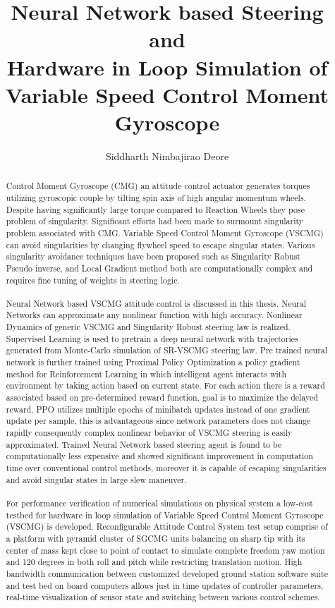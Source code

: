 \documentclass[english,oneside,LaM,binding=0.0cm]{sapthesis}
\title{Neural Network based Steering and \\ Hardware in Loop Simulation of Variable Speed Control Moment Gyroscope}
\author{Siddharth Nimbajirao Deore}
\begin{document}
\frontmatter
\maketitle
\dedication{Dedicated to parents \\ Usha and N. Z. Deore}

\begin{abstract}
{}
Control Moment Gyroscope (CMG) an attitude control actuator generates torques utilizing gyroscopic couple by tilting spin axis of high angular momentum wheels. Despite having significantly large torque compared to Reaction Wheels they pose problem of singularity. Significant efforts had been made to surmount singularity problem associated with CMG. Variable Speed Control Moment Gyroscope (VSCMG) can avoid singularities by changing flywheel speed to escape singular states. Various singularity avoidance techniques have been proposed such as Singularity Robust Pseudo inverse, and Local Gradient method both are computationally complex and requires fine tuning of weights in steering logic. \\
\\
Neural Network based VSCMG attitude control is discussed in this thesis. Neural Networks can approximate any nonlinear function with high accuracy. Nonlinear Dynamics of generic VSCMG and Singularity Robust steering law is realized. Supervised Learning is used to pretrain a deep neural network with trajectories generated from Monte-Carlo simulation of SR-VSCMG steering law. Pre trained neural network is further trained using Proximal Policy Optimization a policy gradient method for Reinforcement Learning in which intelligent agent interacts with environment by taking action based on current state. For each action there is a reward associated based on pre-determined reward function, goal is to maximize the delayed reward. PPO utilizes multiple epochs of minibatch updates instead of one gradient update per sample, this is advantageous since network parameters does not change rapidly consequently complex nonlinear behavior of VSCMG steering is easily approximated. Trained Neural Network based steering agent is found to be computationally less expensive  and showed significant improvement in computation time over conventional control methods, moreover it is capable of escaping singularities and avoid singular states in large slew maneuver.  \\
\\
For performance verification of numerical simulations on physical system a low-cost testbed for hardware in loop simulation of Variable Speed Control Moment Gyroscope (VSCMG) is developed. Reconfigurable Attitude Control System test setup comprise of a platform with pyramid cluster of SGCMG units balancing on sharp tip with its center of mass kept close to point of contact to simulate complete freedom yaw motion and 120 degrees in both roll and pitch while restricting translation motion. High bandwidth communication between customized developed ground station software suite and test bed on board computers allows just in time updates of controller parameters, real-time visualization of sensor state and switching between various control schemes.



\end{abstract}
\end{document}
